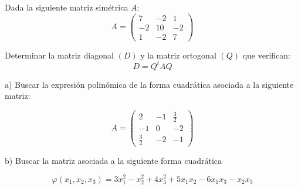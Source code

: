 \begin{Ejer}

Dada la siguiente matriz simétrica $A$:
\[
A=
\begin{pmatrix}
7 & -2 & 1\\
-2 & 10 & -2\\
1 & -2 & 7
\end{pmatrix}
\]

Determinar la matriz diagonal $(D)$ y la matriz ortogonal $(Q)$ que verifican:
\[
D = Q^t A Q
\]
\end{Ejer}

\begin{Ejer}
a) Buscar la expresión polinómica de la forma cuadrática asociada a la siguiente matriz:

\[
A=
\begin{pmatrix}
2 & -1 & \frac{3}{2}\\
-1 & 0 & -2\\
\frac{3}{2} & -2 & -1
\end{pmatrix}
\]



b) Buscar la matriz asociada a la siguiente forma cuadrática

\[
\varphi(x_1,x_2,x_3)
= 3x_1^2 - x_2^2 + 4x_3^2 + 5x_1x_2 - 6x_1x_3 - x_2x_3
\]
\end{Ejer}



